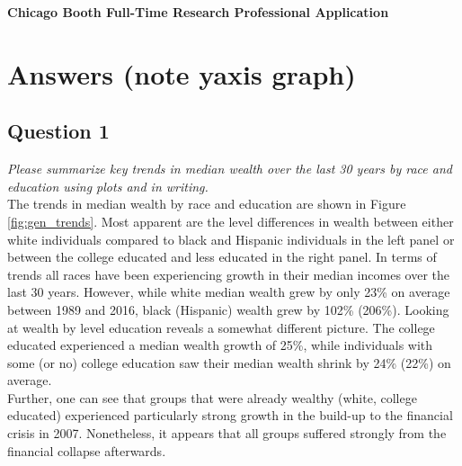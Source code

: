 \documentclass[]{scrartcl}
\begin{document}
\begin{center}
	{\bfseries \Large Chicago Booth Full-Time Research Professional Application}
\end{center}

\section*{Answers (note yaxis graph)}

\subsection*{Question 1}
\textit{Please summarize key trends in median wealth over the last 30 years by race and education using plots
	and in writing.} \\ 

The trends in median wealth by race and education are shown in Figure \ref{fig:gen_trends}. Most apparent are the level differences in wealth between either white individuals compared to black and Hispanic individuals in the left panel or between the college educated and less educated in the right panel. In terms of trends all races have been experiencing growth in their median incomes over the last 30 years. However, while white median wealth grew by only 23\% on average between 1989 and 2016, black (Hispanic) wealth grew by 102\% (206\%). Looking at wealth by level education reveals a somewhat different picture. The college educated experienced a median wealth growth of 25\%, while individuals with some (or no) college education saw their median wealth shrink by 24\% (22\%) on average. \\
Further, one can see that groups that were already wealthy (white, college educated) experienced particularly strong growth in the build-up to the financial crisis in 2007. Nonetheless, it appears that all groups suffered strongly from the financial collapse afterwards.
\end{document}
